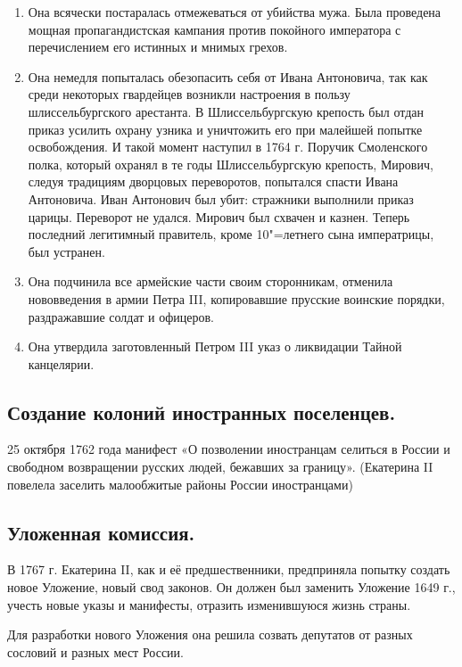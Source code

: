 \begin{enumerate}
    \item{ Она всячески постаралась отмежеваться от убийства мужа. Была проведена мощная пропагандистская кампания против покойного императора с перечислением его истинных и мнимых грехов. }
    \item{ Она немедля попыталась обезопасить себя от Ивана Антоновича, так как среди некоторых гвардейцев возникли настроения в пользу шлиссельбургского арестанта. В Шлиссельбургскую крепость был отдан приказ усилить охрану узника и уничтожить его при малейшей попытке освобождения. И такой момент наступил в 1764 г. Поручик Смоленского полка, который охранял в те годы Шлиссельбургскую крепость, Мирович, следуя традициям дворцовых переворотов, попытался спасти Ивана Антоновича. Иван Антонович был убит: стражники выполнили приказ царицы. Переворот не удался. Мирович был схвачен и казнен. Теперь последний легитимный правитель, кроме 10"=летнего сына императрицы, был устранен. }
    \item{ Она подчинила все армейские части своим сторонникам, отменила нововведения в армии Петра III, копировавшие прусские воинские порядки, раздражавшие солдат и офицеров. }
    \item{ Она утвердила заготовленный Петром III указ о ликвидации Тайной канцелярии. }
\end{enumerate}

\subsection{Создание колоний иностранных поселенцев.}

25 октября 1762 года манифест «О позволении иностранцам селиться в России и свободном возвращении русских людей, бежавших за границу». (Екатерина II повелела заселить малообжитые районы России иностранцами)

\subsection{Уложенная комиссия.}

В 1767 г. Екатерина II, как и её предшественники, предприняла попытку создать новое Уложение, новый свод законов. Он должен был заменить Уложение 1649 г., учесть новые указы и манифесты, отразить изменившуюся жизнь страны.

Для разработки нового Уложения она решила созвать депутатов от разных сословий и разных мест России. 

